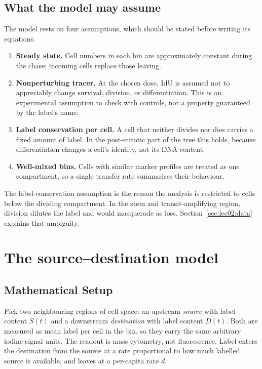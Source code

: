 \subsection{What the model may assume}\label{subsec:lec02:assumptions}
The model rests on four assumptions, which should be stated before writing its equations.
\begin{enumerate}
\item \textbf{Steady state.} Cell numbers in each bin are approximately constant during the chase; incoming cells replace those leaving.
\item \textbf{Nonperturbing tracer.} At the chosen dose, IdU is assumed not to appreciably change survival, division, or differentiation. This is an experimental assumption to check with controls, not a property guaranteed by the label's name.
\item \textbf{Label conservation per cell.} A cell that neither divides nor dies carries a fixed amount of label. In the post-mitotic part of the tree this holds, because differentiation changes a cell's identity, not its DNA content.
\item \textbf{Well-mixed bins.} Cells with similar marker profiles are treated as one compartment, so a single transfer rate summarises their behaviour.
\end{enumerate}

\begin{remark}
The label-conservation assumption is the reason the analysis is restricted to cells below the dividing compartment. In the stem and transit-amplifying region, division dilutes the label and would masquerade as loss. Section~\ref{sec:lec02:data} explains that ambiguity.
\end{remark}

\section{The source--destination model}\label{sec:lec02:model}

\subsection*{Mathematical Setup}
Pick two neighbouring regions of cell space: an upstream \emph{source} with label content $S(t)$ and a downstream \emph{destination} with label content $D(t)$. Both are measured as mean label per cell in the bin, so they carry the same arbitrary iodine-signal units. The readout is mass cytometry, not fluorescence. Label enters the destination from the source at a rate proportional to how much labelled source is available, and leaves at a per-capita rate $d$.


